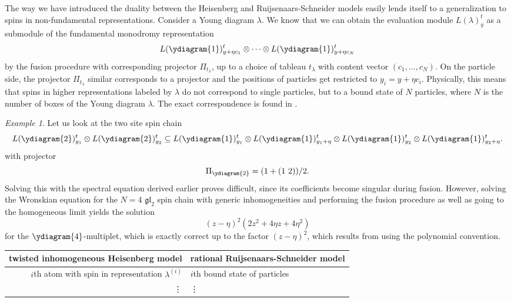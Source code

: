 \documentclass[11pt]{report}
\theoremstyle{definition}
\theoremstyle{remark}
\theoremstyle{remark}
\newtheorem*{example}{Example}
\begin{document}
The way we have introduced the duality between the Heisenberg and Ruijsenaars-Schneider models easily lends itself to a generalization to spins in non-fundamental representations. Consider a Young diagram $\lambda$. We know that we can obtain the evaluation module $L(\lambda)_y^t$ as a submodule of the fundamental monodromy representation
\begin{equation*}
L(\ydiagram{1})_{y+\eta c_1}^t \otimes \cdots \otimes L(\ydiagram{1})_{y+\eta c_N}^t
\end{equation*}
by the fusion procedure with corresponding projector $\Pi_{t_\lambda}$, up to a choice of tableau $t_\lambda$ with content vector $(c_1,...,c_N)$. On the particle side, the projector $\Pi_{t_\lambda}$ similar corresponds to a projector and the positions of particles get restricted to $y_i = y + \eta c_i$. Physically, this means that spins in higher representations labeled by $\lambda$ do not correspond to single particles, but to a bound state of $N$ particles, where $N$ is the number of boxes of the Young diagram $\lambda$. The exact correspondence is found in \cite{article:arakawa:1999}.

\begin{example}
Let us look at the two site spin chain
\begin{equation*}
L(\ydiagram{2})_{y_1}^t \otimes L(\ydiagram{2})_{y_2}^t \subseteq L(\ydiagram{1})_{y_1}^t \otimes L(\ydiagram{1})_{y_1+\eta}^t \otimes L(\ydiagram{1})_{y_2}^t \otimes L(\ydiagram{1})_{y_2+\eta}^t.
\end{equation*}
with projector
\begin{equation*}
\Pi_{\ydiagram{2}} = (1 + (1 \ 2))/2.
\end{equation*}
Solving this with the spectral equation derived earlier proves difficult, since its coefficients become singular during fusion. However, solving the Wronskian equation \cite{book:arutyunov:betheAnsatz} for the $N=4$ $\mathfrak{gl}_2$ spin chain with generic inhomogeneities and performing the fusion procedure as well as going to the homogeneous limit yields the solution
\begin{equation*}
(z-\eta)^2 (2 z^2 + 4 \eta z + 4 \eta^2)
\end{equation*}
for the $\ydiagram{4}$-multiplet, which is exactly correct up to the factor $(z-\eta)^2$, which results from using the polynomial convention.
\end{example}

\begin{center}
\begin{tabular}{|r||l|}
\hline
twisted inhomogeneous Heisenberg model & rational Ruijsenaars-Schneider model \\
\hline
$i$th atom with spin in representation $\lambda^{(i)}$ & $i$th bound state of particles \\
\vdots & \vdots \\
\hline
\end{tabular}
\end{center}
\end{document}
